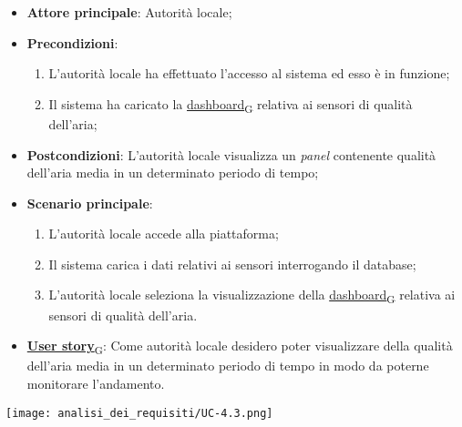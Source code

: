 \begin{itemize}
	\item \textbf{Attore principale}: Autorità locale;
	\item \textbf{Precondizioni}:
	      \begin{enumerate}
		      \item L'autorità locale ha effettuato l'accesso al sistema ed esso è in funzione;
		      \item Il sistema ha caricato la \href{https://7last.github.io/docs/rtb/documentazione-interna/glossario\#dashboard}{dashboard\textsubscript{G}} relativa ai sensori di qualità dell'aria;
	      \end{enumerate}
	\item \textbf{Postcondizioni}: L'autorità locale visualizza un \textit{panel} contenente qualità dell'aria media in un determinato periodo di tempo;
	\item \textbf{Scenario principale}:
	      \begin{enumerate}
		      \item L'autorità locale accede alla piattaforma;
		      \item Il sistema carica i dati relativi ai sensori interrogando il database;
		      \item L'autorità locale seleziona la visualizzazione della \href{https://7last.github.io/docs/rtb/documentazione-interna/glossario\#dashboard}{dashboard\textsubscript{G}} relativa ai sensori di qualità dell'aria.
	      \end{enumerate}
	\item \href{https://7last.github.io/docs/rtb/documentazione-interna/glossario\#user-story}{\textbf{User story}\textsubscript{G}}: Come autorità locale desidero poter visualizzare della qualità dell'aria media in un determinato periodo di tempo
	      in modo da poterne monitorare l'andamento.
\end{itemize}
\begin{center}
	\texttt{[image: analisi\_dei\_requisiti/UC-4.3.png]}
\end{center}

